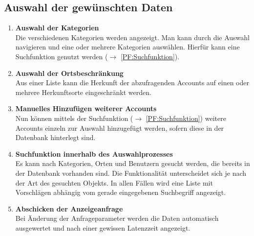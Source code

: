 \subsection{Auswahl der gewünschten Daten} \label{sec:Produktfunktionen}
\begin{enumerate}[ align=left, label={\textbf{\textbackslash F10\arabic*0\textbackslash}} ]
	\item \textbf{Auswahl der Kategorien} \label{PF:KategorienAuswahl}\\ 
	Die verschiedenen Kategorien werden angezeigt. Man kann durch die Auswahl navigieren und eine oder mehrere Kategorien auswählen. Hierfür kann eine Suchfunktion genutzt werden ($\rightarrow$ \ref{PF:Suchfunktion}). 
	\item \textbf{Auswahl der Ortsbeschränkung} \label{PF:OrtAuswahl} \\
	Aus einer Liste kann die Herkunft der abzufragenden Accounts auf einen oder mehrere Herkunftsorte eingeschränkt werden. 
	\item \textbf{Manuelles Hinzufügen weiterer Accounts} \label{PF:AccountHinzufügen} \\
	Nun können mittels der Suchfunktion ($\rightarrow$ \ref{PF:Suchfunktion}) weitere Accounts einzeln zur Auswahl hinzugefügt werden, sofern diese in der Datenbank hinterlegt sind.
	\item \textbf{Suchfunktion innerhalb des Auswahlprozesses} \label{PF:Suchfunktion} \\
	Es kann nach Kategorien, Orten und Benutzern gesucht werden, die bereits in der Datenbank vorhanden sind. Die Funktionalität unterscheidet sich je nach der Art des gesuchten Objekts. In allen Fällen wird eine Liste mit Vorschlägen abhängig vom gerade eingegebenen Suchbegriff angezeigt. 
	\item \textbf{Abschicken der Anzeigeanfrage} \label{PF:Absenden} \\
	Bei Änderung der Anfrageparameter werden die Daten automatisch ausgewertet und nach einer gewissen Latenzzeit angezeigt.
\end{enumerate}	
